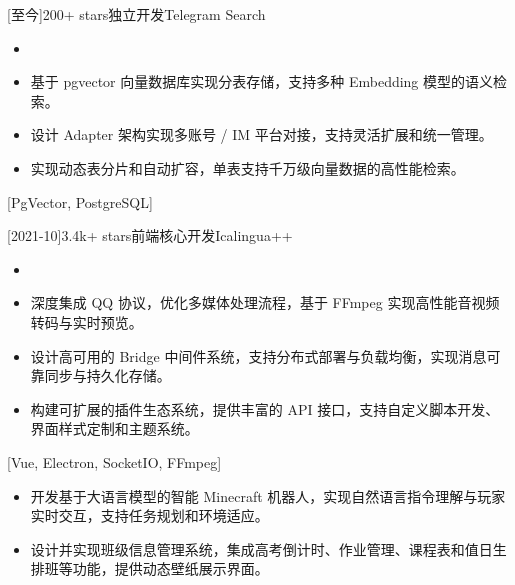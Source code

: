 \documentclass[zh]{resume}
\begin{document}
\begin{projects}
  [至今]{200+ stars}{独立开发}{Telegram Search}{
    \begin{itemize}
      \item {}
      \item 基于 pgvector 向量数据库实现分表存储，支持多种 Embedding 模型的语义检索。
      \item 设计 Adapter 架构实现多账号 / IM 平台对接，支持灵活扩展和统一管理。
      \item 实现动态表分片和自动扩容，单表支持千万级向量数据的高性能检索。
    \end{itemize}
  }[PgVector, PostgreSQL]

  \separator{0.5ex}
  [2021-10]{3.4k+ stars}{前端核心开发}{Icalingua++}{
    \begin{itemize}
      \item {}
      \item 深度集成 QQ 协议，优化多媒体处理流程，基于 FFmpeg 实现高性能音视频转码与实时预览。
      \item 设计高可用的 Bridge 中间件系统，支持分布式部署与负载均衡，实现消息可靠同步与持久化存储。
      \item 构建可扩展的插件生态系统，提供丰富的 API 接口，支持自定义脚本开发、界面样式定制和主题系统。
    \end{itemize}
  }[Vue, Electron, SocketIO, FFmpeg]
\end{projects}

\begin{itemize}
  \item 开发基于大语言模型的智能 Minecraft 机器人，实现自然语言指令理解与玩家实时交互，支持任务规划和环境适应。
  \item 设计并实现班级信息管理系统，集成高考倒计时、作业管理、课程表和值日生排班等功能，提供动态壁纸展示界面。
\end{itemize}
\end{document}
